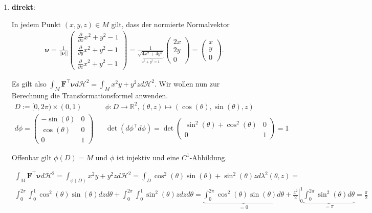 \documentclass[]{article}
\begin{document}
\begin{enumerate}[label=(\roman*)]
	\item \textbf{direkt}:
	
	In jedem Punkt $(x,y,z) \in M$ gilt, dass der normierte Normalvektor
	\begin{align*}
		\bm{\nu} =
		\frac{1}{||\bm{\nu}||} \begin{pmatrix} \frac{\partial}{\partial x} x^2 + y^2 - 1\\ \frac{\partial}{\partial y} x^2 + y^2 - 1\\ \frac{\partial}{\partial z} x^2 + y^2 - 1 \end{pmatrix} =
		\frac{1}{\underbrace{\sqrt{4x^2 + 4y^2}}_{x^2+y^2=1} } \begin{pmatrix} 2x\\ 2y\\ 0 \end{pmatrix} = 
		\begin{pmatrix} x\\ y\\ 0 \end{pmatrix}.
	\end{align*}

	Es gilt also $\int_M \bm{F}^\top \bm{\nu} d\mathcal{H}^2 = \int_M x^2y + y^2z d\mathcal{H}^2$. Wir wollen nun zur Berechnung die Transformationsformel anwenden.
	\begin{align*}
		D := [0, 2\pi) \times (0,1) && \phi:D \rightarrow \mathbb{R}^2, (\theta, z) \mapsto (\cos(\theta), \sin(\theta), z)\\
		d\phi = \begin{pmatrix} -\sin(\theta) & 0 \\ \cos(\theta) & 0 \\ 0 & 1 \end{pmatrix} && \det(d\phi^\top d\phi) = \det\begin{pmatrix} \sin^2(\theta) + \cos^2(\theta) & 0 \\ 0 & 1 \end{pmatrix} = 1
	\end{align*}

	Offenbar gilt $\phi(D)=M$ und $\phi$ ist injektiv und eine $C^1$-Abbildung.

	\begin{align*}
		\int_M \bm{F}^\top \bm{\nu} d\mathcal{H}^2 = \int_{\phi(D)} x^2y + y^2z d\mathcal{H}^2 = \int_D \cos^2(\theta) \sin(\theta) + \sin^2(\theta) z d\lambda^2(\theta, z) =\\
		\int_{0}^{2\pi}\int_{0}^{1} \cos^2(\theta)\sin(\theta) dz d\theta + \int_{0}^{2\pi} \int_{0}^{1} \sin^2(\theta)z dz d\theta = \underbrace{\int_{0}^{2\pi} \cos^2(\theta) \sin(\theta) d\theta}_{=0} + \left.\frac{z^2}{2}\right\vert _0^1 \underbrace{\int_{0}^{2\pi} \sin^2(\theta) d\theta}_{=\pi} = \frac{\pi}{2}
	\end{align*}


\end{enumerate}
\end{document}
